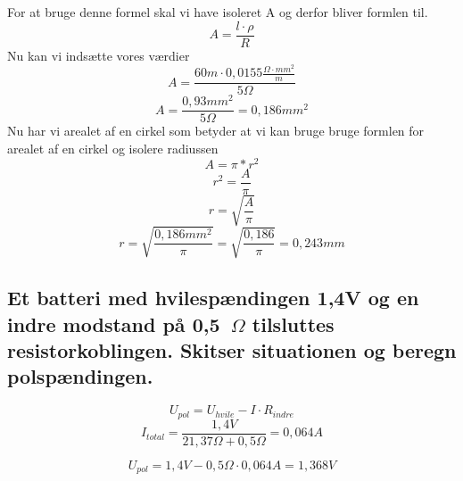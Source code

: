 For at bruge denne formel skal vi have isoleret A og derfor bliver formlen til.
\begin{equation*}
    A=\frac{l\cdot\rho}{R}
\end{equation*}
Nu kan vi indsætte vores værdier
\begin{equation*}
    A=\frac{60m\cdot0,0155\frac{\Omega\cdot mm^{2}}{m}}{5\Omega}
\end{equation*}
\begin{equation*}
    A=\frac{0,93mm^{2}}{5\Omega}=0,186mm^{2}
\end{equation*}
Nu har vi arealet af en cirkel som betyder at vi kan bruge bruge formlen for arealet af en cirkel og isolere radiussen
\begin{equation*}
    A=\pi*r^{2}
\end{equation*}
\begin{equation*}
    r^{2}=\frac{A}{\pi}
\end{equation*}
\begin{equation*}
    r=\sqrt{\frac{A}{\pi}}
\end{equation*}
\begin{equation*}
    r=\sqrt{\frac{0,186mm^{2}}{\pi}} = \sqrt{\frac{0,186}{\pi}} = 0,243mm
\end{equation*}

\subsection{Et batteri med hvilespændingen 1,4V og en indre modstand på 0,5~$\Omega$ tilsluttes resistorkoblingen. Skitser situationen og beregn polspændingen.}
\begin{equation*}
    U_{pol}=U_{hvile}-I\cdot R_{indre}
\end{equation*}
\begin{equation*}
    I_{total}=\frac{1,4V}{21,37\Omega+0,5\Omega}=0,064A
\end{equation*}

\begin{equation*}
    U_{pol}=1,4V-0,5\Omega\cdot 0,064A=1,368V
\end{equation*}
\newpage